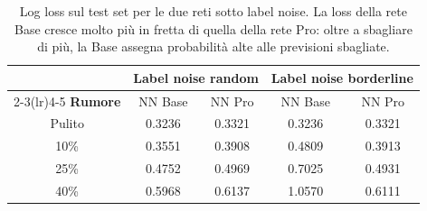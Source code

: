 \begin{table}[H]\centering\small
\caption{Log loss sul test set per le due reti sotto label noise. La loss della rete Base cresce molto più in fretta di quella della rete Pro: oltre a sbagliare di più, la Base assegna probabilità alte alle previsioni sbagliate.}\label{tab:losslabel}
\begin{tabular}{c cc cc}
\toprule
 & \multicolumn{2}{c}{Label noise random} & \multicolumn{2}{c}{Label noise borderline}\\
\cmidrule(lr){2-3}\cmidrule(lr){4-5}
\textbf{Rumore} & NN Base & NN Pro & NN Base & NN Pro \\
\midrule
Pulito & 0.3236 & 0.3321 & 0.3236 & 0.3321 \\
10\%   & 0.3551 & 0.3908 & 0.4809 & 0.3913 \\
25\%   & 0.4752 & 0.4969 & 0.7025 & 0.4931 \\
40\%   & 0.5968 & 0.6137 & 1.0570 & 0.6111 \\
\bottomrule
\end{tabular}
\end{table}
